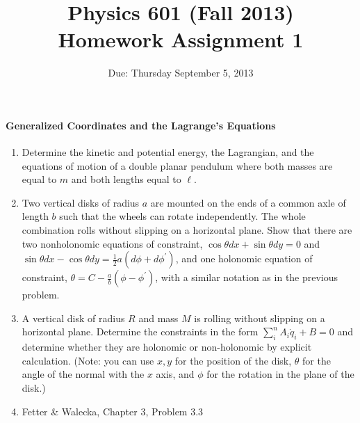 \documentclass[letterpaper,11pt]{article}
\title{Physics 601 (Fall 2013) \\ Homework Assignment 1}
\date{Due: Thursday September 5, 2013}
\begin{document}
\maketitle

\paragraph*{Generalized Coordinates and the Lagrange's Equations}
\begin{enumerate}
 \item Determine the kinetic and potential energy, the Lagrangian, and the equations of motion of a double planar pendulum where both masses are equal to $m$ and both lengths equal to $\ell$.
 \item Two vertical disks of radius $a$ are mounted on the ends of a common axle of length $b$ such that the wheels can rotate independently.  The whole combination rolls without slipping on a horizontal plane.  Show that there are two nonholonomic equations of constraint, $\cos\theta dx + \sin\theta dy = 0$ and $\sin\theta dx - \cos\theta dy = \frac{1}{2} a (d\phi+d\phi^\prime)$, and one holonomic equation of constraint, $\theta = C - \frac{a}{b}(\phi-\phi^\prime)$, with a similar notation as in the previous problem.
 \item A vertical disk of radius $R$ and mass $M$ is rolling without slipping on a horizontal plane.  Determine the constraints in the form $\sum_i^n A_i \dot{q}_i + B = 0$ and determine whether they are holonomic or non-holonomic by explicit calculation.  (Note: you can use $x,y$ for the position of the disk, $\theta$ for the angle of the normal with the $x$ axis, and $\phi$ for the rotation in the plane of the disk.)
 \item Fetter \& Walecka, Chapter 3, Problem 3.3
\end{enumerate}
\end{document}
